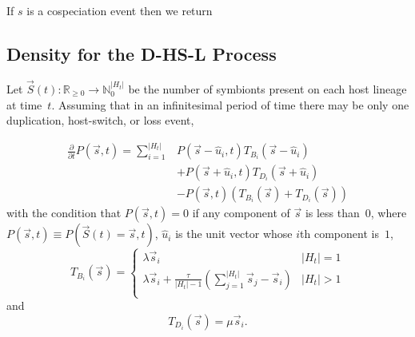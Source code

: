 \documentclass{article}
\begin{document}
            If $s$ is a cospeciation event then we return

        \subsection*{Density for the D-HS-L Process}

            Let $\vec{S}\left(t\right) : \mathbb{R}_{\geq 0} \to
            \mathbb{N}_{0}^{\lvert{H_t}\rvert}$ be the number of symbionts
            present on each host lineage at time~$t$. Assuming that in an
            infinitesimal period of time there may be only one duplication,
            host-switch, or loss event,

            \begin{equation}
                \begin{split}
                    \frac{\partial}{\partial t} P\left(\vec{s},t\right) =
                    \sum_{i=1}^{\lvert{H_t}\rvert}
                    &P\left(\vec{s} - \hat{u}_i, t\right)T_{B_i}\left(\vec{s} -
                    \hat{u}_i\right) \\ &+ P\left(\vec{s} + \hat{u}_i,
                    t\right)T_{D_i}\left(\vec{s} + \hat{u}_i \right) \\ &-
                    P\left(\vec{s}, t\right)\left(T_{B_i}\left(\vec{s}\right) +
                    T_{D_i}\left(\vec{s} \right)\right)
                \end{split}
            \end{equation}
            with the condition that $P\left(\vec{s},t\right) = 0$ if any
            component of $\vec{s}$ is less than~$0$, where $P\left(\vec{s},
            t\right) \equiv P\left(\vec{S}\left(t\right)
            = \vec{s}, t\right)$, $\hat{u}_i$ is the unit vector whose $i$th
            component is~$1$,
            \begin{equation}
                T_{B_i}\left(\vec{s}\right) =
                \begin{cases}
                    \lambda \vec{s}_i & \lvert{H_t}\rvert = 1 \\
                    \lambda \vec{s}_i +
                    \frac{\tau}{\lvert{H_t}\rvert - 1}
                    \left(\sum_{j=1}^{\lvert{H_t}\rvert}
                    {\vec{s}_j}-\vec{s}_i\right) & \lvert{H_t}\rvert > 1 \\
                \end{cases}
            \end{equation}
            and
            \begin{equation}
                T_{D_i}\left(\vec{s}\right) = \mu \vec{s}_i.
            \end{equation}
\end{document}
